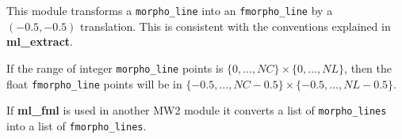 This module transforms a {\tt morpho\_line} into 
an {\tt fmorpho\_line} by a $(-0.5,-0.5)$ translation.
This is consistent with the conventions explained in
{\bf ml\_extract}.

\medskip

If the range of integer {\tt morpho\_line} points is
$\{0,\ldots,NC\}\times\{0,\ldots,NL\}$, then the 
float {\tt fmorpho\_line} points will be in
$\{-0.5,\ldots,NC-0.5\}\times\{-0.5,\ldots,NL-0.5\}$.

\medskip

If {\bf ml\_fml} is used in another MW2 module it converts
a list of {\tt morpho\_lines} into a list of {\tt fmorpho\_lines}.
